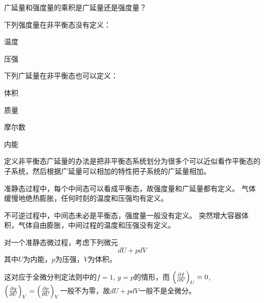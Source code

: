 \documentclass[CJK]{beamer}
\begin{document}
\begin{frame}
\bch
{}

广延量和强度量的乘积是广延量还是强度量？

\ech
\end{frame}

\begin{frame}
\bch

下列强度量在非平衡态没有定义：
\bitem
\item{温度}
\item{压强}
\eitem

\ech
\end{frame}


\begin{frame}
\bch

下列广延量在非平衡态也可以定义：
\bitem
\item{体积}
\item{质量}
\item{摩尔数}
\item{内能}
\eitem

定义非平衡态广延量的办法是把非平衡态系统划分为很多个可以近似看作平衡态的子系统，然后根据广延量可以相加的特性把子系统的广延量相加。


\ech
\end{frame}

\begin{frame}
\bch

\bitem
\item{准静态过程中，每个中间态可以看成平衡态，故强度量和广延量都有定义。
\bex
气体缓慢地绝热膨胀，任何时刻的温度和压强均有定义。
\eex
}
\item{不可逆过程中，中间态未必是平衡态，强度量一般没有定义。
\bex
突然增大容器体积，气体自由膨胀，中间过程的温度和压强没有定义。
\eex
}
\eitem

\ech
\end{frame}


\begin{frame}
\bch

对一个准静态微过程，考虑下列微元
$$ dU + pdV$$
其中$U$为内能，$p$为压强，$V$为体积。

这对应于全微分判定法则中的$f = 1$, $g = p$的情形，而
$\left(\frac{\partial f}{\partial V}\right)_{U} = 0$, $\left(\frac{\partial g}{\partial U}\right)_{V}=\left(\frac{\partial p}{\partial U}\right)_{V}$一般不为零，故$dU + pdV$一般不是全微分。

\ech
\end{frame}
\end{document}
